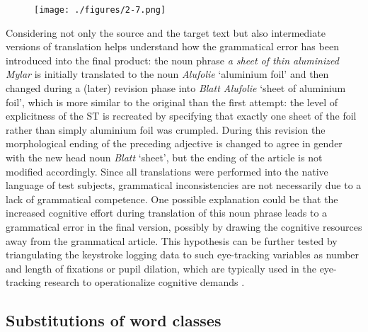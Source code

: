\documentclass[output=paper]{LSP/langsci}
\begin{document}
\begin{figure}
\texttt{[image: ./figures/2-7.png]}
\end{figure}


Considering not only the source and the target text but also intermediate versions of translation helps understand how the grammatical error has been introduced into the final product: the noun phrase \textit{a sheet of thin aluminized Mylar} is initially translated to the noun \textit{Alufolie} ‘aluminium foil’ and then changed during a (later) revision phase into \textit{Blatt Alufolie} ‘sheet of aluminium foil’, which is more similar to the original than the first attempt: the level of explicitness of the ST is recreated by specifying that exactly one sheet of the foil rather than simply aluminium foil was crumpled. During this revision the morphological ending of the preceding adjective is changed to agree in gender with the new head noun \textit{Blatt} ‘sheet’, but the ending of the article is not modified accordingly. Since all translations were performed into the native language of test subjects, grammatical inconsistencies are not necessarily due to a lack of grammatical competence. One possible explanation could be that the increased cognitive effort during translation of this noun phrase leads to a grammatical error in the final version, possibly by drawing the cognitive resources away from the grammatical article. This hypothesis can be further tested by triangulating the keystroke logging data to such eye-tracking variables as number and length of fixations or pupil dilation, which are typically used in the eye-tracking research to operationalize cognitive demands \citep[e.g.][]{Pavlovic2009}.

\subsection{Substitutions of word classes}
\end{document}
